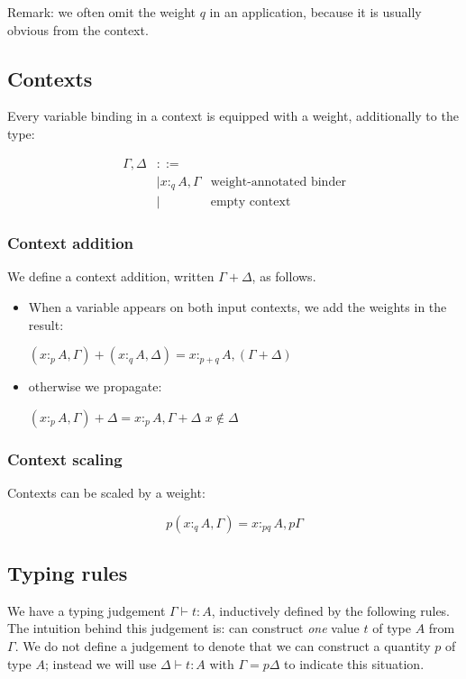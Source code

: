 \documentclass[11pt]{article}
\begin{document}
Remark: we often omit the weight $q$ in an application, because it is
usually obvious from the context.

\subsection{Contexts}
\label{sec:orgheadline6}

Every variable binding in a context is equipped with a weight,
additionally to the type:

\begin{align*}
  Γ,Δ & ::=\\
    & |  x :_q A, Γ & \text{weight-annotated binder} \\
    & |     & \text {empty context}
\end{align*}

\subsubsection{Context addition}
\label{sec:orgheadline4}

We define a context addition, written \(Γ+Δ\), as follows.

\begin{itemize}
\item When a variable appears on both input contexts, we add the weights in
the result:

\((x :_p A,Γ) + (x :_q A,Δ) = x :_{p+q} A, (Γ+Δ)\)

\item otherwise we propagate:

\((x :_p A,Γ) + Δ = x :_p A, Γ+Δ\)   \hfill   \(x ∉ Δ\)
\end{itemize}


\subsubsection{Context scaling}
\label{sec:orgheadline5}

Contexts can be scaled by a weight:

\begin{displaymath}
p(x :_q A, Γ) =  x :_{pq} A, pΓ
\end{displaymath}

\subsection{Typing rules}
\label{sec:orgheadline7}

We have a typing judgement \(Γ ⊢ t : A\), inductively defined by the
following rules.  The intuition behind this judgement is: can
construct \emph{one} value $t$ of type $A$ from $Γ$. We do not define
a judgement to denote that we can construct a quantity $p$ of type
$A$; instead we will use $Δ ⊢ t : A$ with $Γ = pΔ$ to indicate this
situation.
\end{document}
